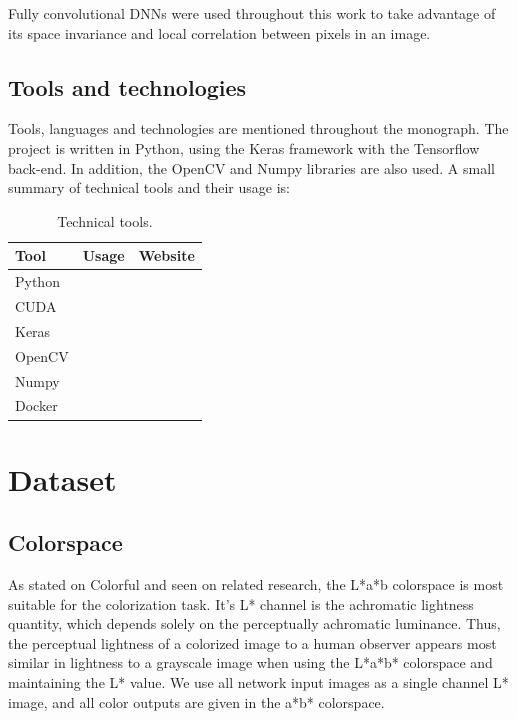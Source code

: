 \documentclass[12pt,openright,twoside,a4paper,english]{abntex2}
\begin{document}
\begin{otherlanguage}{english}
Fully convolutional DNNs were used throughout this work to take advantage of its space invariance and local correlation between pixels in an image.

\subsection{Tools and technologies}
Tools, languages and technologies are mentioned throughout the monograph. The project is written in Python, using the Keras framework with the Tensorflow back-end. In addition, the OpenCV and Numpy libraries are also used. A small summary of technical tools and their usage is:

\begin{table}[H]
    \centering
    \begin{tabular}{lll}
    Tool            & Usage                 & Website             \\ \hline
    Python          &                       &                     \\ \hline
    CUDA            &                       &                     \\ \hline
    Keras           &                       &                     \\ \hline
    OpenCV          &                       &                     \\ \hline
    Numpy           &                       &                     \\ \hline
    Docker          &                       &                     \\ \hline
    \end{tabular}
    \label{table:tools}
    \caption{Technical tools.}
\end{table}

\section{Dataset}
\subsection{Colorspace}
As stated on Colorful \cite{colorful} and seen on related research, the L*a*b colorspace is most suitable for the colorization task. It's L* channel is the achromatic lightness quantity, which depends solely on the perceptually achromatic luminance. Thus, the perceptual lightness of a colorized image to a human observer appears most similar in lightness to a grayscale image when using the L*a*b* colorspace and maintaining the L* value. We use all network input images as a single channel L* image, and all color outputs are given in the a*b* colorspace.


\end{otherlanguage}
\end{document}
